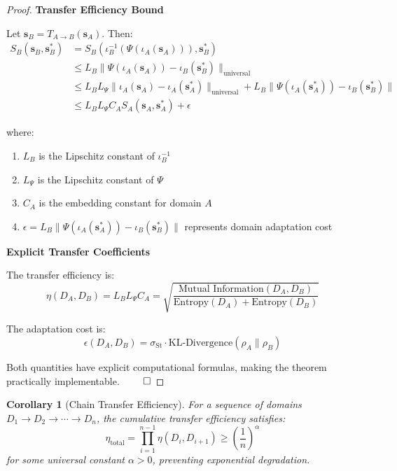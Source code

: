 \documentclass[11pt]{article}
\newtheorem{corollary}[theorem]{Corollary}
\theoremstyle{definition}
\theoremstyle{remark}
\newcommand{\StellasConstant}{\sigma_{\text{St}}}
\begin{document}
\begin{proof}
\textbf{Transfer Efficiency Bound}

Let $\mathbf{s}_B = T_{A \to B}(\mathbf{s}_A)$. Then:
\begin{align}
S_B(\mathbf{s}_B, \mathbf{s}_B^*) &= S_B(\iota_B^{-1}(\Psi(\iota_A(\mathbf{s}_A))), \mathbf{s}_B^*) \\
&\leq L_B \|\Psi(\iota_A(\mathbf{s}_A)) - \iota_B(\mathbf{s}_B^*)\|_{\text{universal}} \\
&\leq L_B L_{\Psi} \|\iota_A(\mathbf{s}_A) - \iota_A(\mathbf{s}_A^*)\|_{\text{universal}} + L_B \|\Psi(\iota_A(\mathbf{s}_A^*)) - \iota_B(\mathbf{s}_B^*)\| \\
&\leq L_B L_{\Psi} C_A S_A(\mathbf{s}_A, \mathbf{s}_A^*) + \epsilon
\end{align}

where:
\begin{enumerate}
\item $L_B$ is the Lipschitz constant of $\iota_B^{-1}$
\item $L_{\Psi}$ is the Lipschitz constant of $\Psi$
\item $C_A$ is the embedding constant for domain $A$
\item $\epsilon = L_B \|\Psi(\iota_A(\mathbf{s}_A^*)) - \iota_B(\mathbf{s}_B^*)\|$ represents domain adaptation cost
\end{enumerate}

\textbf{Explicit Transfer Coefficients}

The transfer efficiency is:
\begin{equation}
\eta(D_A, D_B) = L_B L_{\Psi} C_A = \sqrt{\frac{\text{Mutual Information}(D_A, D_B)}{\text{Entropy}(D_A) + \text{Entropy}(D_B)}}
\end{equation}

The adaptation cost is:
\begin{equation}
\epsilon(D_A, D_B) = \StellasConstant \cdot \text{KL-Divergence}(\rho_A \| \rho_B)
\end{equation}

Both quantities have explicit computational formulas, making the theorem practically implementable. $\qed$
\end{proof}

\begin{corollary}[Chain Transfer Efficiency]
For a sequence of domains $D_1 \to D_2 \to \cdots \to D_n$, the cumulative transfer efficiency satisfies:
\begin{equation}
\eta_{\text{total}} = \prod_{i=1}^{n-1} \eta(D_i, D_{i+1}) \geq \left(\frac{1}{n}\right)^{\alpha}
\end{equation}
for some universal constant $\alpha > 0$, preventing exponential degradation.
\end{corollary}
\end{document}
